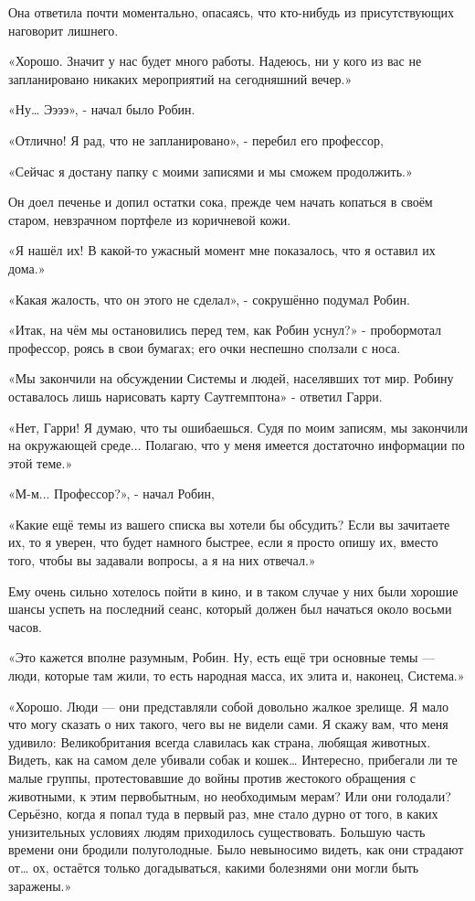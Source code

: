 \documentclass[a4paper,12pt]{book}
\begin{document}
\par
Она ответила почти моментально, опасаясь, что кто-нибудь из присутствующих наговорит лишнего.
\par
«Хорошо. Значит у нас будет много работы. Надеюсь, ни у кого из вас не запланировано никаких мероприятий на сегодняшний вечер.»
\par
«Ну… Ээээ», - начал было Робин.
\par
«Отлично! Я рад, что не запланировано», - перебил его профессор,
\par
«Сейчас я достану папку с моими записями и мы сможем продолжить.»
\par
Он доел печенье и допил остатки сока, прежде чем начать копаться в своём старом, невзрачном портфеле из коричневой кожи.
\par
«Я нашёл их! В какой-то ужасный момент мне показалось, что я оставил их дома.»
\par
«Какая жалость, что он этого не сделал», - сокрушённо подумал Робин.
\par
«Итак, на чём мы остановились перед тем, как Робин уснул?» - пробормотал профессор, роясь в свои бумагах; его очки неспешно сползали с носа.
\par
«Мы закончили на обсуждении Системы и людей, населявших тот мир. Робину оставалось лишь нарисовать карту Саутгемптона» - ответил Гарри.
\par
«Нет, Гарри! Я думаю, что ты ошибаешься. Судя по моим записям, мы закончили на окружающей среде... Полагаю, что у меня имеется достаточно информации по этой теме.»
\par
«М-м... Профессор?», - начал Робин,
\par
«Какие ещё темы из вашего списка вы хотели бы обсудить? Если вы зачитаете их, то я уверен, что будет намного быстрее, если я просто опишу их, вместо того, чтобы вы задавали вопросы, а я на них отвечал.»
\par
Ему очень сильно хотелось пойти в кино, и в таком случае у них были хорошие шансы успеть на последний сеанс, который должен был начаться около восьми часов.
\par
«Это кажется вполне разумным, Робин. Ну, есть ещё три основные темы — люди, которые там жили, то есть народная масса, их элита и, наконец, Система.»
\par
«Хорошо. Люди — они представляли собой довольно жалкое зрелище. Я мало что могу сказать о них такого, чего вы не видели сами. Я скажу вам, что меня удивило: Великобритания всегда славилась как страна, любящая животных. Видеть, как на самом деле убивали собак и кошек… Интересно, прибегали ли те малые группы, протестовавшие до войны против жестокого обращения с животными, к этим первобытным, но необходимым мерам? Или они голодали? Серьёзно, когда я попал туда в первый раз, мне стало дурно от того, в каких унизительных условиях людям приходилось существовать. Большую часть времени они бродили полуголодные. Было невыносимо видеть, как они страдают от… ох, остаётся только догадываться, какими болезнями они могли быть заражены.»
\end{document}
